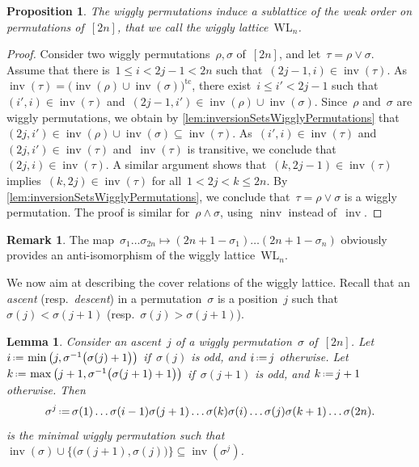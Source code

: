 \documentclass{amsart}
\newtheorem{proposition}[theorem]{Proposition}
\newtheorem{lemma}[theorem]{Lemma}
\theoremstyle{definition}
\newtheorem{remark}[theorem]{Remark}
\newcommand{\eqdef}{\mbox{\,\raisebox{0.2ex}{\scriptsize\ensuremath{\mathrm:}}\ensuremath{=}\,}} %
\DeclareMathOperator{\inv}{inv} %
\DeclareMathOperator{\ninv}{ninv} %
\newcommand{\darkblue}{\color{darkblue}} %
\newcommand{\defn}[1]{\textsl{\darkblue #1}} %
\newcommand{\meet}{\wedge} %
\newcommand{\join}{\vee} %
\newcommand{\wigglyLattice}{\mathrm{WL}} %
\begin{document}
\begin{proposition}
The wiggly permutations induce a sublattice of the weak order on permutations of~$[2n]$, that we call the \defn{wiggly lattice}~$\wigglyLattice_n$.
\end{proposition}

\begin{proof}
Consider two wiggly permutations~$\rho, \sigma$ of~$[2n]$, and let~$\tau = \rho \join \sigma$.
Assume that there is~$1 \le i < 2j-1 < 2n$ such that~$(2j-1, i) \in \inv(\tau)$.
As $\inv(\tau) = \big( \inv(\rho) \cup \inv(\sigma) \big)^\textrm{tc}$, there exist~$i \le i' < 2j-1$ such that~$(i', i) \in \inv(\tau)$ and~$(2j-1, i') \in \inv(\rho) \cup \inv(\sigma)$.
Since~$\rho$ and~$\sigma$ are wiggly permutations, we obtain by \cref{lem:inversionSetsWigglyPermutations} that~$(2j, i') \in \inv(\rho) \cup \inv(\sigma) \subseteq \inv(\tau)$.
As~$(i', i) \in \inv(\tau)$ and~$(2j, i') \in \inv(\tau)$ and~$\inv(\tau)$ is transitive, we conclude that~$(2j,i) \in \inv(\tau)$.
A similar argument shows that~$(k, 2j-1) \in \inv(\tau)$ implies~$(k, 2j) \in \inv(\tau)$ for all~$1 < 2j < k \le 2n$.
By \cref{lem:inversionSetsWigglyPermutations}, we conclude that~$\tau = \rho \join \sigma$ is a wiggly permutation.
The proof is similar for~$\rho \meet \sigma$, using $\ninv$ instead of~$\inv$.
\end{proof}

\begin{remark}
\label{rem:wigglyLatticeAntiIsomorphism}
The map~$\sigma_1 \dots \sigma_{2n} \mapsto (2n+1-\sigma_1) \dots (2n+1-\sigma_n)$ obviously provides an anti-isomorphism of the wiggly lattice~$\wigglyLattice_n$.
\end{remark}

We now aim at describing the cover relations of the wiggly lattice.
Recall that an \defn{ascent} (resp.~\defn{descent}) in a permutation~$\sigma$ is a position~$j$ such that~$\sigma(j) < \sigma(j+1)$ (resp.~$\sigma(j) > \sigma(j+1)$).

\begin{lemma}\label{lem:wigglyCoverRelation}
Consider an ascent~$j$ of a wiggly permutation~$\sigma$ of~$[2n]$.
Let~$i \eqdef \min \big( j, \sigma^{-1} \big( \sigma(j)+1 \big) \big)$ if~$\sigma(j)$ is odd, and $i \eqdef j$ otherwise.
Let~$k \eqdef \max \big( j+1, \sigma^{-1} \big( \sigma(j+1)+1 \big) \big)$ if~$\sigma(j+1)$ is odd, and $k \eqdef j+1$ otherwise.
Then
\[
\sigma^j \eqdef \sigma(1) \dots \sigma(i-1) \sigma(j+1) \dots \sigma(k) \sigma(i) \dots \sigma(j) \sigma(k+1) \dots \sigma(2n).
\]
is the minimal wiggly permutation such that~$\inv(\sigma) \cup \big\{ \big( \sigma(j+1), \sigma(j) \big) \big\} \subseteq \inv(\sigma^j)$.
\end{lemma}
\end{document}
